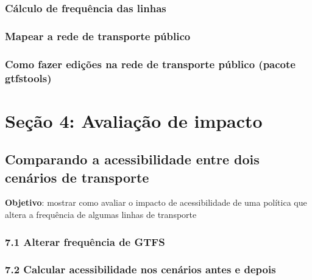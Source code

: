\documentclass[
  letterpaper,
  DIV=11,
  numbers=noendperiod]{scrreprt}
\begin{document}
\hypertarget{cuxe1lculo-de-frequuxeancia-das-linhas-1}{%
\section{Cálculo de frequência das
linhas}\label{cuxe1lculo-de-frequuxeancia-das-linhas-1}}

\hypertarget{mapear-a-rede-de-transporte-puxfablico-1}{%
\section{Mapear a rede de transporte
público}\label{mapear-a-rede-de-transporte-puxfablico-1}}

\hypertarget{como-fazer-ediuxe7uxf5es-na-rede-de-transporte-puxfablico-pacote-gtfstools-1}{%
\section{Como fazer edições na rede de transporte público (pacote
gtfstools)}\label{como-fazer-ediuxe7uxf5es-na-rede-de-transporte-puxfablico-pacote-gtfstools-1}}

\part{Seção 4: Avaliação de impacto}

\hypertarget{comparando-a-acessibilidade-entre-dois-cenuxe1rios-de-transporte}{%
\chapter{Comparando a acessibilidade entre dois cenários de
transporte}\label{comparando-a-acessibilidade-entre-dois-cenuxe1rios-de-transporte}}

\textbf{Objetivo}: mostrar como avaliar o impacto de acessibilidade de
uma política que altera a frequência de algumas linhas de transporte

\hypertarget{alterar-frequuxeancia-de-gtfs}{%
\section{7.1 Alterar frequência de
GTFS}\label{alterar-frequuxeancia-de-gtfs}}

\hypertarget{calcular-acessibilidade-nos-cenuxe1rios-antes-e-depois}{%
\section{7.2 Calcular acessibilidade nos cenários antes e
depois}\label{calcular-acessibilidade-nos-cenuxe1rios-antes-e-depois}}
\end{document}

